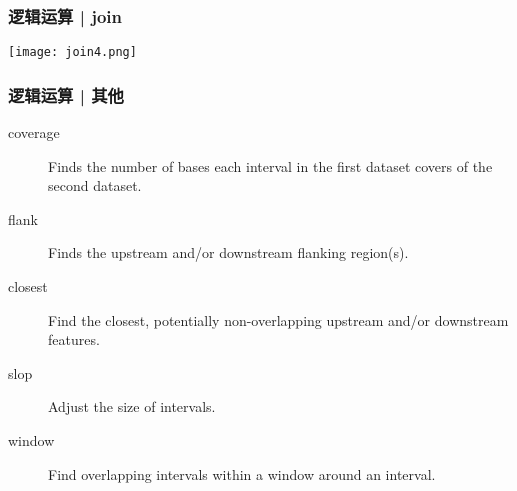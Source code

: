 \documentclass[table]{beamer}
\begin{document}
\begin{frame}
  \frametitle{逻辑运算 | join}
    \begin{center}
      \texttt{[image: join4.png]}
    \end{center}
\end{frame}

\begin{frame}
  \frametitle{逻辑运算 | 其他}
  \begin{description}
    \item[coverage] Finds the number of bases each interval in the first dataset covers of the second dataset.
    \item[flank] Finds the upstream and/or downstream flanking region(s).
    \item[closest] Find the closest, potentially non-overlapping upstream and/or downstream features.
    \item[slop] Adjust the size of intervals.
    \item[window] Find overlapping intervals within a window around an interval.
  \end{description}
\end{frame}
\end{document}
